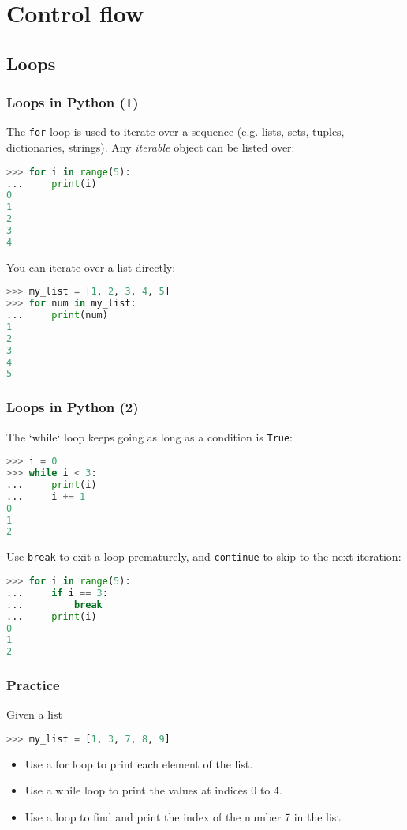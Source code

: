  \section{Control flow}
\subsection{Loops}
\begin{frame}[fragile]
  \frametitle{Loops in Python (1)}
  The \lstinline$for$ loop is used to iterate over a sequence (e.g. lists, sets, tuples, dictionaries, strings). Any \emph{iterable} object can be listed over:
  \begin{lstlisting}[language=Python,numbers=none]
>>> for i in range(5):
...     print(i)
0
1
2
3
4
  \end{lstlisting}\pause
  You can iterate over a list directly:
  \begin{lstlisting}[language=Python,numbers=none]
>>> my_list = [1, 2, 3, 4, 5]
>>> for num in my_list:
...     print(num)
1
2
3
4
5
  \end{lstlisting}
\end{frame}

\begin{frame}[fragile]
  \frametitle{Loops in Python (2)}
  The `while` loop keeps going as long as a condition is \lstinline{True}:
  \begin{lstlisting}[language=Python,numbers=none]
>>> i = 0
>>> while i < 3:
...     print(i)
...     i += 1
0
1
2
  \end{lstlisting}\pause
  Use \lstinline|break| to exit a loop prematurely, and \lstinline|continue| to skip to the next iteration:
  \begin{lstlisting}[language=Python,numbers=none]
>>> for i in range(5):
...     if i == 3:
...         break
...     print(i)
0
1
2
  \end{lstlisting}
\end{frame}

\begin{frame}[fragile]
  \frametitle{Practice}
  Given a list
  \begin{lstlisting}[language=Python,numbers=none]
>>> my_list = [1, 3, 7, 8, 9] 
  \end{lstlisting}
 
 \begin{itemize}
  \item Use a for loop to print each element of the list.\pause
  \item Use a while loop to print the values at indices 0 to 4.\pause
  \item Use a loop to find and print the index of the number 7 in the list.
 \end{itemize}
\end{frame}

